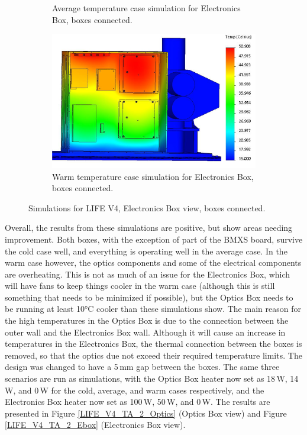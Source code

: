 \begin{figure}
\begin{subfigure}[h]{0.58\textwidth}
        \caption{Average temperature case simulation for Electronics Box, boxes connected.}
        \label{fig:LIFE_V4_TA_Ebox_1b}
    \end{subfigure}
    \begin{subfigure}[h]{0.58\textwidth}
        \centering
        \includegraphics[width=\textwidth]{chap3_images/LIFE_V4_images/TA_Full_Model_Iter_3_ebox_FIXED.png}
        \caption{Warm temperature case simulation for Electronics Box, boxes connected.}
        \label{fig:LIFE_V4_TA_Ebox_1c}
    \end{subfigure}
    \caption{Simulations for LIFE V4, Electronics Box view, boxes connected.}
    \label{LIFE_V4_TA_1_Ebox}
\end{figure}

Overall, the results from these simulations are positive, but show areas needing improvement. Both boxes, with the exception of part of the BMXS board, survive the cold case well, and everything is operating well in the average case. In the warm case however, the optics components and some of the electrical components are overheating. This is not as much of an issue for the Electronics Box, which will have fans to keep things cooler in the warm case (although this is still something that needs to be minimized if possible), but the Optics Box needs to be running at least 10°C cooler than these simulations show. The main reason for the high temperatures in the Optics Box is due to the connection between the outer wall and the Electronics Box wall. Although it will cause an increase in temperatures in the Electronics Box, the thermal connection between the boxes is removed, so that the optics due not exceed their required temperature limits. The design was changed to have a 5\,mm gap between the boxes. The same three scenarios are run as simulations, with the Optics Box heater now set as 18\,W, 14\,W, and 0\,W for the cold, average, and warm cases respectively, and the Electronics Box heater now set as 100\,W, 50\,W, and 0\,W. The results are presented in Figure \ref{LIFE_V4_TA_2_Optics} (Optics Box view) and Figure \ref{LIFE_V4_TA_2_Ebox} (Electronics Box view).

